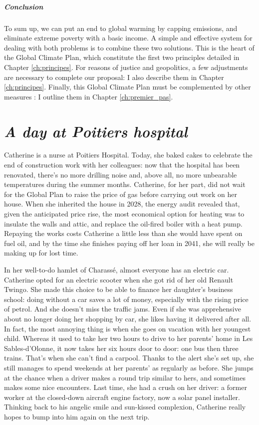\documentclass[a5paper,english,openany]{memoir}
\begin{document}
\paragraph{Conclusion}
To sum up, we can put an end to global warming by capping emissions, and eliminate extreme poverty with a basic income. A simple and effective system for dealing with both problems is to combine these two solutions. This is the heart of the Global Climate Plan, %
which constitute the first two principles detailed in Chapter \ref{ch:principes}. For reasons of justice and geopolitics, a few adjustments are necessary to complete our proposal: I also describe them in Chapter \ref{ch:principes}. %
Finally, this Global Climate Plan must be complemented by other measures%
: I outline them in Chapter \ref{ch:premier_pas}.


\chapter*{\textit{A day at Poitiers hospital}}\label{ch:narr_poitiers}

Catherine is a nurse at Poitiers Hospital. Today, she baked cakes to celebrate the end of construction work with her colleagues: now that the hospital has been renovated, there's no more drilling noise and, above all, no more unbearable temperatures during the summer months. Catherine, for her part, did not wait for the Global Plan to raise the price of gas before carrying out work on her house. When she inherited the house in 2028, the energy audit revealed that, given the anticipated price rise, the most economical option for heating was to insulate the walls and attic, and replace the oil-fired boiler with a heat pump. Repaying the works costs Catherine a little less than she would have spent on fuel oil, and by the time she finishes paying off her loan in 2041, she will really be making up for lost time. 

In her well-to-do hamlet of Charassé, almost everyone has an electric car. Catherine opted for an electric scooter when she got rid of her old Renault Twingo. She made this choice to be able to finance her daughter's business school: doing without a car saves a lot of money, especially with the rising price of petrol. And she doesn't miss the traffic jams. Even if she was apprehensive about no longer doing her shopping by car, she likes having it delivered after all. In fact, the most annoying thing is when she goes on vacation with her youngest child. Whereas it used to take her two hours to drive to her parents' home in Les Sables-d'Olonne, it now takes her six hours door to door: one bus then three trains. That's when she can't find a carpool. Thanks to the alert she's set up, she still manages to spend weekends at her parents' as regularly as before. She jumps at the chance when a driver makes a round trip similar to hers, and sometimes makes some nice encounters. Last time, she had a crush on her driver: a former worker at the closed-down aircraft engine factory, now a solar panel installer. Thinking back to his angelic smile and sun-kissed complexion, Catherine really hopes to bump into him again on the next trip.
\end{document}

